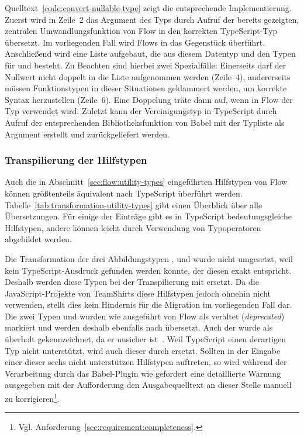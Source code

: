 Quelltext~\ref{code:convert-nullable-type} zeigt die entsprechende Implementierung. Zuerst wird in Zeile~2 das Argument des Typs  durch Aufruf der bereits gezeigten, zentralen Umwandlungsfunktion von Flow in den korrekten TypeScript-Typ übersetzt. Im vorliegenden Fall wird Flows  in das Gegenstück  überführt. Anschließend wird eine Liste aufgebaut, die aus diesem Datentyp und den Typen für  und  besteht. Zu Beachten sind hierbei zwei Spezialfälle: Einerseits darf der Nullwert nicht doppelt in die Liste aufgenommen werden (Zeile~4), andererseits müssen Funktionstypen in dieser Situationen geklammert werden, um korrekte Syntax herzustellen (Zeile~6). Eine Doppelung träte dann auf, wenn in Flow der Typ  verwendet wird. Zuletzt kann der Vereinigungstyp in TypeScript durch Aufruf der entsprechenden Bibliotheksfunktion von Babel mit der Typliste als Argument erstellt und zurückgeliefert werden.

\subsubsection{Transpilierung der Hilfstypen}

Auch die in Abschnitt~\ref{sec:flow:utility-types} eingeführten Hilfstypen von Flow können größtenteils äquivalent nach TypeScript überführt werden. Tabelle~\ref{tab:transformation-utility-types} gibt einen Überblick über alle Übersetzungen. Für einige der Einträge gibt es in TypeScript bedeutungsgleiche Hilfstypen, andere können leicht durch Verwendung von Typoperatoren abgebildet werden.



Die Transformation der drei Abbildungstypen ,  und  wurde nicht umgesetzt, weil kein TypeScript-Ausdruck gefunden werden konnte, der diesen exakt entspricht. Deshalb werden diese Typen bei der Transpilierung mit  ersetzt. Da die JavaScript-Projekte von TeamShirts diese Hilfstypen jedoch ohnehin nicht verwenden, stellt dies kein Hindernis für die Migration im vorliegenden Fall dar. Die zwei Typen  und  wurden wie ausgeführt von Flow als veraltet (\textit{deprecated}) markiert und werden deshalb ebenfalls nach  übersetzt. Auch der  wurde als überholt gekennzeichnet, da er unsicher ist~\autocite{FLOW:LINT_RULE_REFERENCE}. Weil TypeScript einen derartigen Typ nicht unterstützt, wird auch dieser durch  ersetzt. Sollten in der Eingabe einer dieser sechs nicht unterstützen Hilfstypen auftreten, so wird während der Verarbeitung durch das Babel-Plugin wie gefordert eine detaillierte Warnung ausgegeben mit der Aufforderung den Ausgabequelltext an dieser Stelle manuell zu korrigieren\footnote{Vgl. Anforderung~\ref{sec:requirement:completeness}.}.

